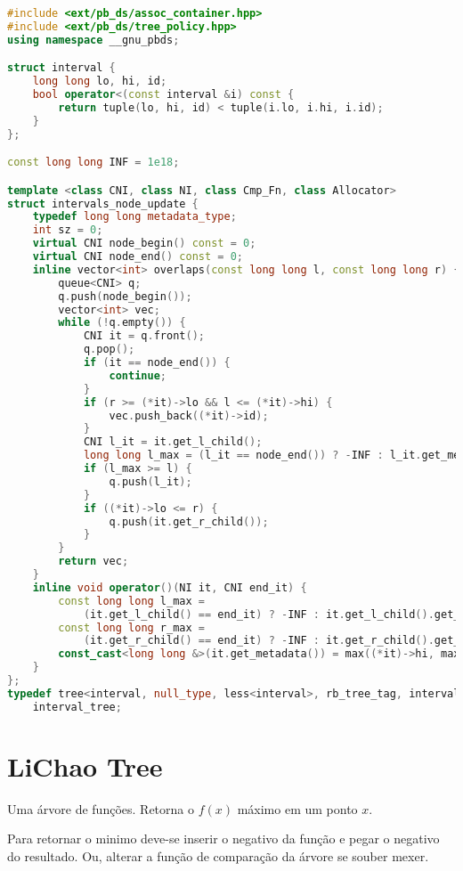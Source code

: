 \documentclass[10pt, a4paper, oneside]{book}
\begin{document}
\begin{lstlisting}[language=C++]
#include <ext/pb_ds/assoc_container.hpp>
#include <ext/pb_ds/tree_policy.hpp>
using namespace __gnu_pbds;

struct interval {
    long long lo, hi, id;
    bool operator<(const interval &i) const {
        return tuple(lo, hi, id) < tuple(i.lo, i.hi, i.id);
    }
};

const long long INF = 1e18;

template <class CNI, class NI, class Cmp_Fn, class Allocator>
struct intervals_node_update {
    typedef long long metadata_type;
    int sz = 0;
    virtual CNI node_begin() const = 0;
    virtual CNI node_end() const = 0;
    inline vector<int> overlaps(const long long l, const long long r) {
        queue<CNI> q;
        q.push(node_begin());
        vector<int> vec;
        while (!q.empty()) {
            CNI it = q.front();
            q.pop();
            if (it == node_end()) {
                continue;
            }
            if (r >= (*it)->lo && l <= (*it)->hi) {
                vec.push_back((*it)->id);
            }
            CNI l_it = it.get_l_child();
            long long l_max = (l_it == node_end()) ? -INF : l_it.get_metadata();
            if (l_max >= l) {
                q.push(l_it);
            }
            if ((*it)->lo <= r) {
                q.push(it.get_r_child());
            }
        }
        return vec;
    }
    inline void operator()(NI it, CNI end_it) {
        const long long l_max =
            (it.get_l_child() == end_it) ? -INF : it.get_l_child().get_metadata();
        const long long r_max =
            (it.get_r_child() == end_it) ? -INF : it.get_r_child().get_metadata();
        const_cast<long long &>(it.get_metadata()) = max((*it)->hi, max(l_max, r_max));
    }
};
typedef tree<interval, null_type, less<interval>, rb_tree_tag, intervals_node_update>
    interval_tree;
\end{lstlisting}
\hfill

\section{LiChao Tree}


Uma árvore de funções. Retorna o $f(x)$ máximo em um ponto $x$.



Para retornar o minimo deve-se inserir o negativo da função e pegar o negativo do resultado. Ou, alterar a função de comparação da árvore se souber mexer.
\end{document}
